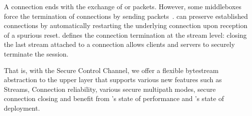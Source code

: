A \tcp connection ends with the exchange of \fin or \rst packets. However, some
middleboxes force the termination of \tcp connections by sending \rst
packets~\cite{rfc3360,weaver2009detecting}. \tcpls can preserve established
connections by automatically restarting the underlying \tcp connection upon
reception of a spurious reset. \tcpls defines the connection termination at the
stream level: closing the last stream attached to a \tcp connection allows
clients and servers to securely terminate the \tcpls session.

That is, with the Secure Control Channel, we offer a flexible bytestream
abstraction to the upper layer that supports various new features such as
Streams, Connection reliability, various secure multipath modes, secure
connection closing and benefit from \tcp's state of performance and \tls's
state of deployment.


